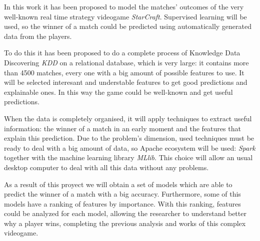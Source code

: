 %
%

In this work it has been proposed to model the matches' outcomes of the very
well-known real time strategy videogame \emph{StarCraft}. Supervised learning
will be used, so the winner of a match could be predicted using automatically
generated data from the players.


To do this it has been proposed to do a complete process of Knowledge Data
Discovering \emph{KDD} on a relational database, which is very large: it
contains more than 4500 matches, every one with a big amount of possible
features to use. It will be selected interesant and understable features to
get good predictions and explainable ones. In this way the game could be
well-known and get useful predictions.

When the data is completely organised, it will apply techniques to extract
useful information: the winner of a match in an early moment and the features
that explain this prediction. Due to the problem's dimension, used techniques
must be ready to deal with a big amount of data, so Apache ecosystem will
be used: \emph{Spark} together with the machine learning library \emph{MLlib}.
This choice will allow an usual desktop computer to deal with all this data
without any problems.

As a result of this proyect we will obtain a set of models which are able to
predict the winner of a match with a big accuracy. Furthermore, some of this
models have a ranking of features by importance. With this ranking, features
could be analyzed for each model, allowing the researcher to understand better
why a player wins, completing the previous analysis and works of this complex
videogame.

